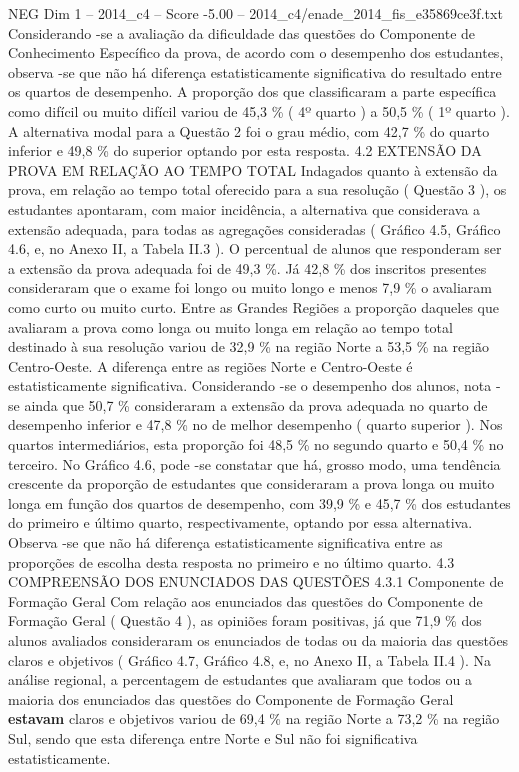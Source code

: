 \begin{textsample}{NEG Dim 1 – 2014\_c4 – Score -5.00 – 2014\_c4/enade\_2014\_fis\_e35869ce3f.txt}
Considerando -se a avaliação da dificuldade das questões do Componente de Conhecimento Específico da prova, de acordo com o desempenho dos estudantes, observa -se que não há diferença estatisticamente significativa do resultado entre os quartos de desempenho.
A proporção dos que classificaram a parte específica como difícil ou muito difícil variou de 45,3 \% ( 4º quarto ) a 50,5 \% ( 1º quarto ).
A alternativa modal para a Questão 2 foi o grau médio, com 42,7 \% do quarto inferior e 49,8 \% do superior optando por esta resposta. 4.2 EXTENSÃO DA PROVA EM RELAÇÃO AO TEMPO TOTAL Indagados quanto à extensão da prova, em relação ao tempo total oferecido para a sua resolução ( Questão 3 ), os estudantes apontaram, com maior incidência, a alternativa que considerava a extensão adequada, para todas as agregações consideradas ( Gráfico 4.5, Gráfico 4.6, e, no Anexo II, a Tabela II.3 ).
O percentual de alunos que responderam ser a extensão da prova adequada foi de 49,3 \%.
Já 42,8 \% dos inscritos presentes consideraram que o exame foi longo ou muito longo e menos 7,9 \% o avaliaram como curto ou muito curto.
Entre as Grandes Regiões a proporção daqueles que avaliaram a prova como longa ou muito longa em relação ao tempo total destinado à sua resolução variou de 32,9 \% na região Norte a 53,5 \% na região Centro-Oeste.
A diferença entre as regiões Norte e Centro-Oeste é estatisticamente significativa.
Considerando -se o desempenho dos alunos, nota -se ainda que 50,7 \% consideraram a extensão da prova adequada no quarto de desempenho inferior e 47,8 \% no de melhor desempenho ( quarto superior ).
Nos quartos intermediários, esta proporção foi 48,5 \% no segundo quarto e 50,4 \% no terceiro.
No Gráfico 4.6, pode -se constatar que há, grosso modo, uma tendência crescente da proporção de estudantes que consideraram a prova longa ou muito longa em função dos quartos de desempenho, com 39,9 \% e 45,7 \% dos estudantes do primeiro e último quarto, respectivamente, optando por essa alternativa.
Observa -se que não há diferença estatisticamente significativa entre as proporções de escolha desta resposta no primeiro e no último quarto. 4.3 COMPREENSÃO DOS ENUNCIADOS DAS QUESTÕES 4.3.1 Componente de Formação Geral Com relação aos enunciados das questões do Componente de Formação Geral ( Questão 4 ), as opiniões foram positivas, já que 71,9 \% dos alunos avaliados consideraram os enunciados de todas ou da maioria das questões claros e objetivos ( Gráfico 4.7, Gráfico 4.8, e, no Anexo II, a Tabela II.4 ).
Na análise regional, a percentagem de estudantes que avaliaram que todos ou a maioria dos enunciados das questões do Componente de Formação Geral \textbf{estavam} claros e objetivos variou de 69,4 \% na região Norte a 73,2 \% na região Sul, sendo que esta diferença entre Norte e Sul não foi significativa estatisticamente.

\end{textsample}
